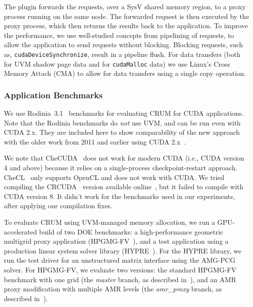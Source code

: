 \documentclass[11pt]{article}
\begin{document}
The plugin forwards the requests, over a SysV shared memory region, to a proxy
process running on the same node. The forwarded request is then executed by the
proxy process, which then returns the results back to the application. To
improve the performance, we use well-studied concepts from pipelining of
requests,
to allow the application to send requests without blocking. Blocking requests,
such as, \texttt{cudaDeviceSynchronize}, result in a pipeline flush. For data
transfers (both for UVM shadow page data and for {\tt cudaMalloc} data) we use
Linux's
Cross Memory Attach (CMA) to allow for data transfers using a single copy
operation.




\subsubsection{Application Benchmarks}
\label{sec:benchmarks}

We use Rodinia~3.1~\cite{che_rodinia_2009} benchmarks for evaluating CRUM for
CUDA applications. Note that the Rodinia benchmarks do {\em not} use UVM, and
can be run even with CUDA 2.x.  They are included here to show comparability of
the new approach with the older work from 2011 and earlier using CUDA
2.x~\cite{takizawa2009checuda,nukada2011nvcr,takizawa2011checl}.

We note that CheCUDA~\cite{takizawa2009checuda} does not work for
modern CUDA (i.e., CUDA version 4 and above) because it relies on a
single-process checkpoint-restart approach. CheCL~\cite{takizawa2011checl}
only supports OpenCL and does not work with CUDA. We tried compiling the
CRCUDA~\cite{gtc2016crcuda} version available online~\cite{crcudaSource},
but it failed to compile with CUDA version 8. It didn't work for the
benchmarks used in our experiments, after applying our compilation fixes.

To evaluate CRUM using UVM-managed memory allocation, we run a GPU-accelerated
build of two DOE benchmarks: a high-performance geometric multigrid proxy
application (HPGMG-FV~\cite{hpgmg}), and a test application using a
 production linear system solver library (HYPRE~\cite{hypre}).  For the
HYPRE library, we run the test driver for an unstructured matrix interface
using
the AMG-PCG solver. For HPGMG-FV, we evaluate two versions: the standard
HPGMG-FV benchmark with one grid (the {\em master} branch, as described
in~\cite{sakharnykh_hpgmg_2016}), and an AMR proxy modification with multiple
AMR levels (the {\em amr\_proxy} branch, as described in~\cite{sakharnykh_amrproxy_2016}).
\end{document}
